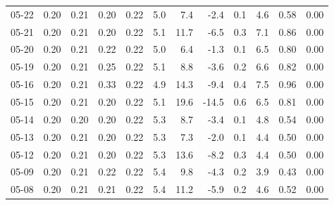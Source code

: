 \begin{threeparttable}
{\begin{tabular}{lrrrrrrrrrrr}
  05-22 &          0.20 &          0.21 &          0.20 &        0.22 &                 5.0 &                 7.4 &       -2.4 &                 0.1 &              4.6 &            0.58 &                   0.00 \\
  05-21 &          0.20 &          0.21 &          0.20 &        0.22 &                 5.1 &                11.7 &       -6.5 &                 0.3 &              7.1 &            0.86 &                   0.00 \\
  05-20 &          0.20 &          0.21 &          0.22 &        0.22 &                 5.0 &                 6.4 &       -1.3 &                 0.1 &              6.5 &            0.80 &                   0.00 \\
  05-19 &          0.20 &          0.21 &          0.25 &        0.22 &                 5.1 &                 8.8 &       -3.6 &                 0.2 &              6.6 &            0.82 &                   0.00 \\
  05-16 &          0.20 &          0.21 &          0.33 &        0.22 &                 4.9 &                14.3 &       -9.4 &                 0.4 &              7.5 &            0.96 &                   0.00 \\
  05-15 &          0.20 &          0.21 &          0.20 &        0.22 &                 5.1 &                19.6 &      -14.5 &                 0.6 &              6.5 &            0.81 &                   0.00 \\
  05-14 &          0.20 &          0.20 &          0.20 &        0.22 &                 5.3 &                 8.7 &       -3.4 &                 0.1 &              4.8 &            0.54 &                   0.00 \\
  05-13 &          0.20 &          0.21 &          0.20 &        0.22 &                 5.3 &                 7.3 &       -2.0 &                 0.1 &              4.4 &            0.50 &                   0.00 \\
  05-12 &          0.20 &          0.21 &          0.20 &        0.22 &                 5.3 &                13.6 &       -8.2 &                 0.3 &              4.4 &            0.50 &                   0.00 \\
  05-09 &          0.20 &          0.21 &          0.22 &        0.22 &                 5.4 &                 9.8 &       -4.3 &                 0.2 &              3.9 &            0.43 &                   0.00 \\
  05-08 &          0.20 &          0.21 &          0.21 &        0.22 &                 5.4 &                11.2 &       -5.9 &                 0.2 &              4.6 &            0.52 &                   0.00 \\

\end{tabular}}
\end{threeparttable}
